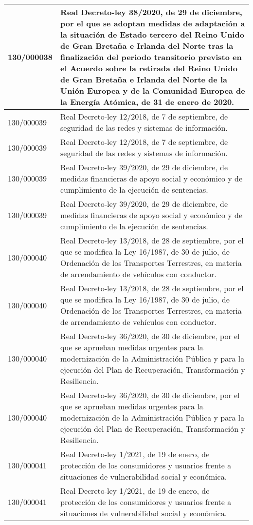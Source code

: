 {\begin{table}[H]
\begin{center}
\begin{tabularx}{\linewidth}{| l | X |}
\hline
130/000038 & Real Decreto-ley 38/2020, de 29 de diciembre, por el que se adoptan medidas de adaptación a la situación de Estado tercero del Reino Unido de Gran Bretaña e Irlanda del Norte tras la finalización del periodo transitorio previsto en el Acuerdo sobre la retirada del Reino Unido de Gran Bretaña e Irlanda del Norte de la Unión Europea y de la Comunidad Europea de la Energía Atómica, de 31 de enero de 2020. \\
\hline
130/000039 & Real Decreto-ley 12/2018, de 7 de septiembre, de seguridad de las redes y sistemas de información. \\
\hline
130/000039 & Real Decreto-ley 12/2018, de 7 de septiembre, de seguridad de las redes y sistemas de información. \\
\hline
130/000039 & Real Decreto-ley 39/2020, de 29 de diciembre, de medidas financieras de apoyo social y económico y de cumplimiento de la ejecución de sentencias. \\
\hline
130/000039 & Real Decreto-ley 39/2020, de 29 de diciembre, de medidas financieras de apoyo social y económico y de cumplimiento de la ejecución de sentencias. \\
\hline
130/000040 & Real Decreto-ley 13/2018, de 28 de septiembre, por el que se modifica la Ley 16/1987, de 30 de julio, de Ordenación de los Transportes Terrestres, en materia de arrendamiento de vehículos con conductor. \\
\hline
130/000040 & Real Decreto-ley 13/2018, de 28 de septiembre, por el que se modifica la Ley 16/1987, de 30 de julio, de Ordenación de los Transportes Terrestres, en materia de arrendamiento de vehículos con conductor. \\
\hline
130/000040 & Real Decreto-ley 36/2020, de 30 de diciembre, por el que se aprueban medidas urgentes para la modernización de la Administración Pública y para la ejecución del Plan de Recuperación, Transformación y Resiliencia. \\
\hline
130/000040 & Real Decreto-ley 36/2020, de 30 de diciembre, por el que se aprueban medidas urgentes para la modernización de la Administración Pública y para la ejecución del Plan de Recuperación, Transformación y Resiliencia. \\
\hline
130/000041 & Real Decreto-ley 1/2021, de 19 de enero, de protección de los consumidores y usuarios frente a situaciones de vulnerabilidad social y económica. \\
\hline
130/000041 & Real Decreto-ley 1/2021, de 19 de enero, de protección de los consumidores y usuarios frente a situaciones de vulnerabilidad social y económica. \\

\end{tabularx}
\end{center}
\end{table}}
